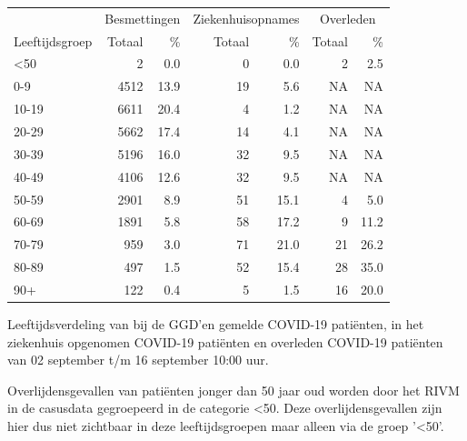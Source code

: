 \documentclass[
  english,
  man,floatsintext]{apa6}
\begin{document}
\begin{table}
\centering\begingroup\fontsize{11}{13}\selectfont

\begin{threeparttable}
\begin{tabular}{lrrrrrr}
\toprule
\multicolumn{1}{c}{ } & \multicolumn{2}{c}{Besmettingen} & \multicolumn{2}{c}{Ziekenhuisopnames} & \multicolumn{2}{c}{Overleden} \\
\cmidrule(l{3pt}r{3pt}){2-3} \cmidrule(l{3pt}r{3pt}){4-5} \cmidrule(l{3pt}r{3pt}){6-7}
Leeftijdsgroep & Totaal & \% & Totaal & \% & Totaal & \%\\
\midrule
<50 & 2 & 0.0 & 0 & 0.0 & 2 & 2.5\\
0-9 & 4512 & 13.9 & 19 & 5.6 & NA & NA\\
10-19 & 6611 & 20.4 & 4 & 1.2 & NA & NA\\
20-29 & 5662 & 17.4 & 14 & 4.1 & NA & NA\\
30-39 & 5196 & 16.0 & 32 & 9.5 & NA & NA\\
40-49 & 4106 & 12.6 & 32 & 9.5 & NA & NA\\
50-59 & 2901 & 8.9 & 51 & 15.1 & 4 & 5.0\\
60-69 & 1891 & 5.8 & 58 & 17.2 & 9 & 11.2\\
70-79 & 959 & 3.0 & 71 & 21.0 & 21 & 26.2\\
80-89 & 497 & 1.5 & 52 & 15.4 & 28 & 35.0\\
90+ & 122 & 0.4 & 5 & 1.5 & 16 & 20.0\\
\bottomrule
\end{tabular}
\begin{tablenotes}
\item[1] Leeftijdsverdeling van bij de GGD’en gemelde COVID-19 patiënten, in het ziekenhuis opgenomen COVID-19 patiënten en overleden COVID-19 patiënten van 02 september t/m 16 september 10:00 uur.
\item[2] Overlijdensgevallen van patiënten jonger dan 50 jaar oud worden door het RIVM in de casusdata gegroepeerd in de categorie <50. Deze overlijdensgevallen zijn hier dus niet zichtbaar in deze leeftijdsgroepen maar alleen via de groep '<50'.
\end{tablenotes}
\end{threeparttable}
\endgroup{}
\end{table}

\newpage
\end{document}
